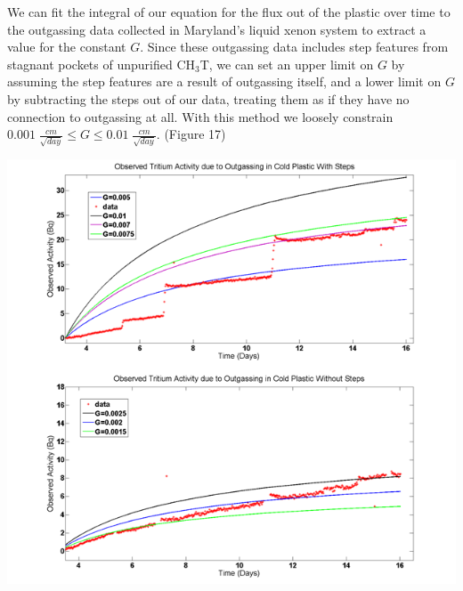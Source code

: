 \documentclass[a4paper,12pt]{article}
\begin{document}
We can fit the integral of our equation for the flux out of the plastic over time to the outgassing data collected in Maryland's liquid xenon system to extract a value for the constant $G$. Since these outgassing data includes step features from stagnant pockets of unpurified CH$_3$T, we can set an upper limit on $G$ by assuming the step features are a result of outgassing itself, and a lower limit on $G$ by subtracting the steps out of our data, treating them as if they have no connection to outgassing at all. With this method we loosely constrain $0.001 \; \frac{cm}{\sqrt{day}} \leq G \leq 0.01 \; \frac{cm}{\sqrt{day}}.$ (Figure 17)

\begin{center}
\includegraphics[scale=0.85]{StepsandNoSteps.png}
\end{center}
\end{document}
